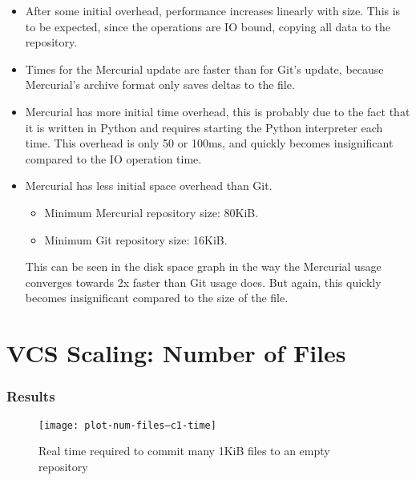 \begin{itemize}

    \item After some initial overhead, performance increases linearly with size.
        This is to be expected, since the operations are IO bound, copying all
        data to the repository.

    \item Times for the Mercurial update are faster than for Git's update,
        because Mercurial's archive format only saves deltas to the file.

    \item Mercurial has more initial time overhead, this is probably due to the
        fact that it is written in Python and requires starting the Python
        interpreter each time. This overhead is only 50 or 100ms, and quickly
        becomes insignificant compared to the IO operation time.

    \item Mercurial has less initial space overhead than Git.

        \begin{itemize}
            \setlength{\itemsep}{0pt}
            \setlength{\parskip}{0pt}
            \setlength{\parsep}{0pt}
            \item Minimum Mercurial repository size: 80KiB.
            \item Minimum Git repository size: 16KiB.
        \end{itemize}

        This can be seen in the disk space graph in the way the Mercurial usage
        converges towards 2x faster than Git usage does. But again, this quickly
        becomes insignificant compared to the size of the file.

\end{itemize}

\fi

\section{VCS Scaling: Number of Files}

\subsubsection{Results}

\begin{figure}[p]
  \caption{Real time required to commit many 1KiB files to an empty repository}
  \label{fig:plot-num-files--c1-time}
  \centering
    \texttt{[image: plot-num-files--c1-time]}
\end{figure}


